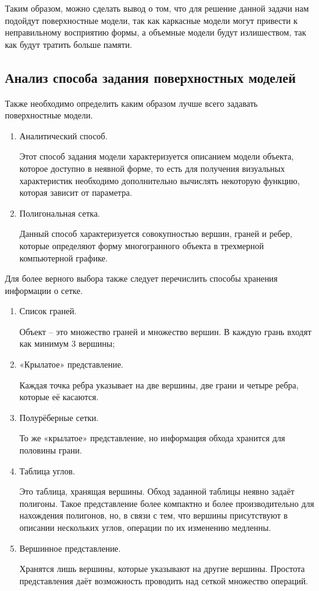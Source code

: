 Таким образом, можно сделать вывод о том, что для решение данной задачи нам подойдут поверхностные модели, так как каркасные модели могут привести к неправильному восприятию формы, а объемные модели будут излишеством, так как будут тратить больше памяти.



\subsection{Анализ способа задания поверхностных моделей}

Также необходимо определить каким образом лучше всего задавать поверхностные модели.

\begin{enumerate} 
\item Аналитический способ.

 Этот способ задания модели характеризуется описанием модели объекта, которое доступно в неявной форме, то есть для получения визуальных характеристик необходимо дополнительно вычислять некоторую функцию, которая зависит от параметра.

\item Полигональная сетка.

 Данный способ характеризуется совокупностью вершин, граней и ребер, которые определяют форму многогранного объекта в трехмерной компьютерной графике.

\end{enumerate}


Для более верного выбора также следует перечислить способы хранения информации о сетке.

\begin{enumerate}

\item Список граней. 

Объект – это множество граней и множество вершин. В каждую грань входят как минимум 3 вершины;
\item«Крылатое» представление. 

Каждая точка ребра указывает на две вершины, две грани и четыре ребра, которые её касаются.

\item Полурёберные сетки.

 То же «крылатое» представление, но информация обхода хранится для половины грани.
 
\item Таблица углов.

 Это таблица, хранящая вершины. Обход заданной таблицы неявно задаёт полигоны. Такое представление более компактно и более производительно для нахождения полигонов, но, в связи с тем, что вершины присутствуют в описании нескольких углов, операции по их изменению медленны.
 
\item Вершинное представление.

 Хранятся лишь вершины, которые указывают на другие вершины. Простота представления даёт возможность проводить над сеткой множество операций.

\end{enumerate}



